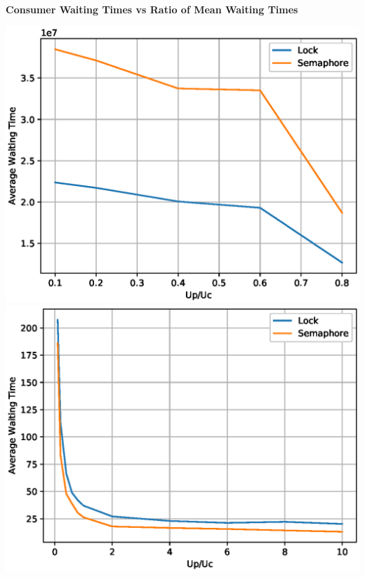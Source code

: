 \documentclass[a4paper,12pt]{report}
\begin{document}
\begin{center}
\begin{large}
\textbf{Consumer Waiting Times vs Ratio of Mean Waiting Times}\\
\end{large}
\includegraphics[scale=0.7]{consumerd.eps}
\includegraphics[scale=0.7]{consumer.eps}
\end{center}
\newpage
\end{document}
